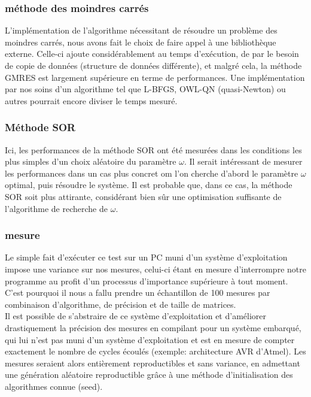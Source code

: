 \subsubsection{méthode des moindres carrés}
L'implémentation de l'algorithme nécessitant de résoudre un problème des moindres carrés, nous avons fait le choix de faire appel à une bibliothèque externe. Celle-ci ajoute considérablement au temps d'exécution, de par le besoin de copie de données (structure de données différente), et malgré cela, la méthode GMRES est largement supérieure en terme de performances. Une implémentation par nos soins d'un algorithme tel que L-BFGS, OWL-QN (quasi-Newton) ou autres pourrait encore diviser le temps mesuré.


\subsubsection{Méthode SOR}
Ici, les performances de la méthode SOR ont été mesurées dans les conditions les plus simples d'un choix aléatoire du paramètre $\omega$. Il serait intéressant de mesurer les performances dans un cas plus concret om l'on cherche d'abord le paramètre $\omega$ optimal, puis résoudre le système. Il est probable que, dans ce cas, la méthode SOR soit plus attirante, considérant bien sûr une optimisation suffisante de l'algorithme de recherche de $\omega$.

\subsubsection{mesure}
Le simple fait d'exécuter ce test sur un PC muni d'un système d'exploitation impose une variance sur nos mesures, celui-ci étant en mesure d'interrompre notre programme au profit d'un processus d'importance supérieure à tout moment. C'est pourquoi il nous a fallu prendre un échantillon de 100 mesures par combinaison d'algorithme, de précision et de taille de matrices.\\

Il est possible de s'abstraire de ce système d'exploitation et d'améliorer drastiquement la précision des mesures en compilant pour un système embarqué, qui lui n'est pas muni d'un système d'exploitation et est en mesure de compter exactement le nombre de cycles écoulés (exemple: architecture AVR d'Atmel). Les mesures seraient alors entièrement reproductibles et sans variance, en admettant une génération aléatoire reproductible grâce à une méthode d'initialisation des algorithmes connue (seed). 


